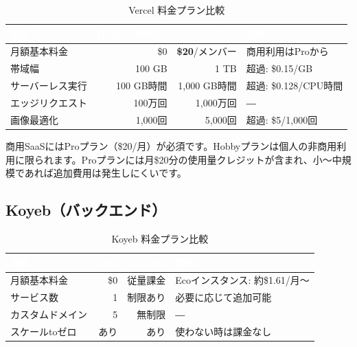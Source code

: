 \documentclass[a4paper,11pt]{ltjsarticle}
\begin{document}
\begin{table}[H]
\centering
\caption{Vercel 料金プラン比較}
\begin{tabularx}{\textwidth}{lrrX}
\toprule
\rowcolor{headerblue}\textcolor{white}{\textbf{項目}} & \textcolor{white}{\textbf{Hobby（無料）}} & \textcolor{white}{\textbf{Pro}} & \textcolor{white}{\textbf{備考}} \\
\midrule
月額基本料金 & \$0 & \textbf{\$20}/メンバー & 商用利用はProから \\
\rowcolor{lightgray}
帯域幅 & 100 GB & 1 TB & 超過: \$0.15/GB \\
サーバーレス実行 & 100 GB時間 & 1,000 GB時間 & 超過: \$0.128/CPU時間 \\
\rowcolor{lightgray}
エッジリクエスト & 100万回 & 1,000万回 & ― \\
画像最適化 & 1,000回 & 5,000回 & 超過: \$5/1,000回 \\
\bottomrule
\end{tabularx}
\end{table}

\begin{infobox}[Vercelの選定理由]
商用SaaSにはProプラン（\$20/月）が必須です。Hobbyプランは個人の非商用利用に限られます。Proプランには月\$20分の使用量クレジットが含まれ、小〜中規模であれば追加費用は発生しにくいです。
\end{infobox}

\subsection{Koyeb（バックエンド）}

\begin{table}[H]
\centering
\caption{Koyeb 料金プラン比較}
\begin{tabularx}{\textwidth}{lrrX}
\toprule
\rowcolor{headerblue}\textcolor{white}{\textbf{項目}} & \textcolor{white}{\textbf{Free}} & \textcolor{white}{\textbf{Starter}} & \textcolor{white}{\textbf{備考}} \\
\midrule
月額基本料金 & \$0 & 従量課金 & Ecoインスタンス: 約\$1.61/月〜 \\
\rowcolor{lightgray}
サービス数 & 1 & 制限あり & 必要に応じて追加可能 \\
カスタムドメイン & 5 & 無制限 & ― \\
\rowcolor{lightgray}
スケールtoゼロ & あり & あり & 使わない時は課金なし \\
\bottomrule
\end{tabularx}
\end{table}
\end{document}
